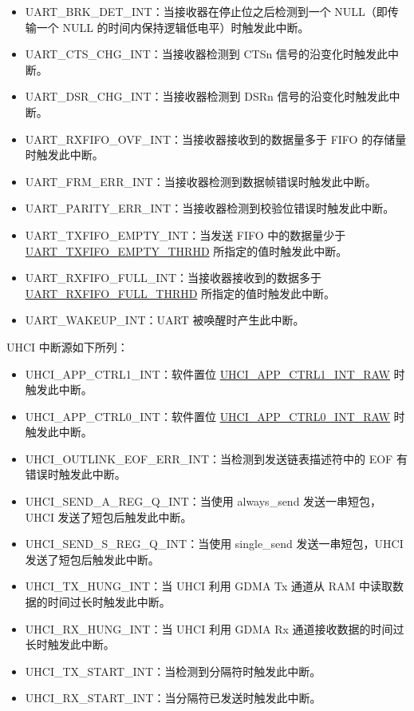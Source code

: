 \documentclass[main\_\_CN.tex]{subfiles}
\begin{document}
\begin{itemize}
\item \label{int:UARTBRKDETINT}UART\_BRK\_DET\_INT：当接收器在停止位之后检测到一个 NULL（即传输一个 NULL 的时间内保持逻辑低电平）时触发此中断。
\item \label{int:UARTCTSCHGINT}UART\_CTS\_CHG\_INT：当接收器检测到 CTSn 信号的沿变化时触发此中断。
\item \label{int:UARTDSRCHGINT}UART\_DSR\_CHG\_INT：当接收器检测到 DSRn 信号的沿变化时触发此中断。
\item \label{int:UARTRXFIFOOVFINT}UART\_RXFIFO\_OVF\_INT：当接收器接收到的数据量多于 FIFO 的存储量时触发此中断。
\item \label{int:UARTFRMERRINT}UART\_FRM\_ERR\_INT：当接收器检测到数据帧错误时触发此中断。
\item \label{int:UARTPARITYERRINT}UART\_PARITY\_ERR\_INT：当接收器检测到校验位错误时触发此中断。
\item \label{int:UARTTXFIFOEMPTYINT}UART\_TXFIFO\_EMPTY\_INT：当发送 FIFO 中的数据量少于 \hyperref[fielddesc:UARTTXFIFOEMPTYTHRHD]{UART\_TXFIFO\_EMPTY\_THRHD} 所指定的值时触发此中断。
\item \label{int:UARTRXFIFOFULLINT}UART\_RXFIFO\_FULL\_INT：当接收器接收到的数据多于 \hyperref[fielddesc:UARTRXFIFOFULLTHRHD]{UART\_RXFIFO\_FULL\_THRHD} 所指定的值时触发此中断。
\item \label{int:UARTWAKEUPINT}UART\_WAKEUP\_INT：UART 被唤醒时产生此中断。
\end{itemize}

UHCI 中断源如下所列：

\begin{itemize}
\item \label{int:UHCIAPPCTRL1INT}UHCI\_APP\_CTRL1\_INT：软件置位 \hyperref[fielddesc:UHCIAPPCTRL1INTRAW]{UHCI\_APP\_CTRL1\_INT\_RAW} 时触发此中断。
\item \label{int:UHCIAPPCTRL0INT}UHCI\_APP\_CTRL0\_INT：软件置位 \hyperref[fielddesc:UHCIAPPCTRL0INTRAW]{UHCI\_APP\_CTRL0\_INT\_RAW} 时触发此中断。
\item \label{int:UHCIOUTLINKEOFERRINT}UHCI\_OUTLINK\_EOF\_ERR\_INT：当检测到发送链表描述符中的 EOF 有错误时触发此中断。
\item \label{int:UHCISENDAREGQINT}UHCI\_SEND\_A\_REG\_Q\_INT：当使用 always\_send 发送一串短包，UHCI 发送了短包后触发此中断。
\item \label{int:UHCISENDSREGQINT}UHCI\_SEND\_S\_REG\_Q\_INT：当使用 single\_send 发送一串短包，UHCI 发送了短包后触发此中断。
\item \label{int:UHCITXHUNGINT}UHCI\_TX\_HUNG\_INT：当 UHCI 利用 GDMA Tx 通道从 RAM 中读取数据的时间过长时触发此中断。
\item \label{int:UHCIRXHUNGINT}UHCI\_RX\_HUNG\_INT：当 UHCI 利用 GDMA Rx 通道接收数据的时间过长时触发此中断。
\item \label{int:UHCITXSTARTINT}UHCI\_TX\_START\_INT：当检测到分隔符时触发此中断。
\item \label{int:UHCIRXSTARTINT}UHCI\_RX\_START\_INT：当分隔符已发送时触发此中断。
\end{itemize}
\end{document}
